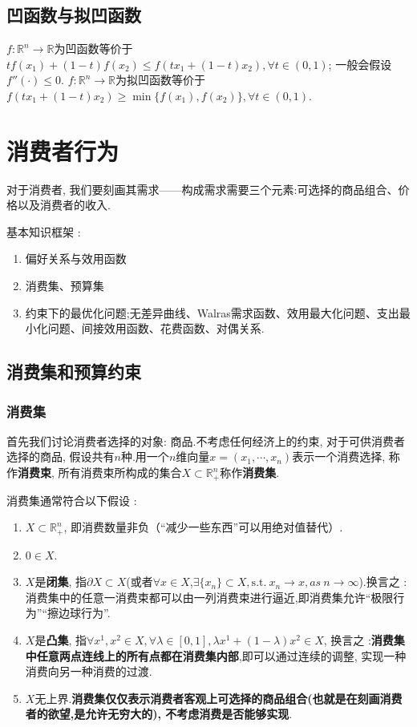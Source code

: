 \documentclass[lang=cn,10pt]{elegantbook}
\begin{document}
\section{凹函数与拟凹函数}
$f:\mathbb{R}^n\to\mathbb{R}$为凹函数等价于$tf(x_1)+(1-t)f(x_2)\leq f(tx_1+(1-t)x_2),\forall t\in (0,1)$; 一般会假设$f''(\cdot)\leq 0$.
$f:\mathbb{R}^n\to\mathbb{R}$为拟凹函数等价于$f(tx_1+(1-t)x_2)\geq \min\{f(x_1),f(x_2)\},\forall t\in (0,1)$.
\chapter{消费者行为}
对于消费者, 我们要刻画其需求——构成需求需要三个元素:可选择的商品组合、价格以及消费者的收入.

基本知识框架 :
\begin{enumerate}
    \item 偏好关系与效用函数
    \item 消费集、预算集
    \item 约束下的最优化问题;无差异曲线、Walras需求函数、效用最大化问题、支出最小化问题、间接效用函数、花费函数、对偶关系.
\end{enumerate}
\newpage
\section{消费集和预算约束}

\subsection{消费集}
首先我们讨论消费者选择的对象: 商品.不考虑任何经济上的约束, 对于可供消费者选择的商品, 假设共有$n$种.用一个$n$维向量$x=(x_1,\cdots,x_n)$表示一个消费选择, 称作\textbf{消费束}, 所有消费束所构成的集合$X\subset \mathbb{R}^n_{+}$称作\textbf{消费集}.

消费集通常符合以下假设 :
\begin{enumerate}
    \item $X\subset \mathbb{R}_{+}^{n}$, 即消费数量非负（“减少一些东西”可以用绝对值替代）.
    \item $0\in X$.
    \item $X$是\textbf{闭集}, 指$\partial X\subset X$(或者$\forall x\in X$,$\exists \{x_n\}\subset X,\mathrm{s.t.}\ x_n\to x,as\ n\to\infty$).换言之 :消费集中的任意一消费束都可以由一列消费束进行逼近,即消费集允许“极限行为”“擦边球行为”.
    \item $X$是\textbf{凸集}, 指$\forall x^1,x^2\in X,\forall \lambda\in [0,1],\lambda x^1+(1-\lambda)x^2\in X$, 换言之 :\textbf{消费集中任意两点连线上的所有点都在消费集内部},即可以通过连续的调整, 实现一种消费向另一种消费的过渡.
    \item $X$无上界.\textbf{消费集仅仅表示消费者客观上可选择的商品组合(也就是在刻画消费者的欲望,是允许无穷大的), 不考虑消费是否能够实现}.
\end{enumerate}
\end{document}
